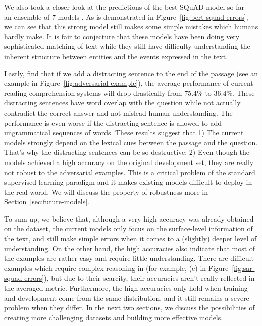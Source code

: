 We also took a closer look at the predictions of the best SQuAD model so far --- an ensemble of 7  models \cite{devlin2018bert}. As is demonstrated in Figure~\ref{fig:bert-squad-errors}, we can see that this strong model still makes some simple mistakes which humans hardly make. It is fair to conjecture that these models have been doing very sophisticated matching of text while they still have difficulty understanding the inherent structure between entities and the events expressed in the text.


Lastly,  find that if we add a distracting sentence to the end of the passage (see an example in Figure~\ref{fig:adversarial-example}), the average performance of current reading comprehension systems will drop drastically from 75.4\% to 36.4\%. These distracting sentences have word overlap with the question while not actually contradict the correct answer and not mislead human understanding. The performance is even worse if the distracting sentence is allowed to add ungrammatical sequences of words. These results suggest that 1) The current models strongly depend on the lexical cues between the passage and the question. That's why the distracting sentences can be so destructive; 2) Even though the models achieved a high accuracy on the original development set, they are really not robust to the adversarial examples. This is a critical problem of the standard supervised learning paradigm and it makes existing models difficult to deploy in the real world. We will discuss the property of robustness more in Section~\ref{sec:future-models}.

To sum up, we believe that, although a very high accuracy was already obtained on the  dataset, the current models only focus on the surface-level information of the text, and still make simple errors when it comes to a (slightly) deeper level of understanding. On the other hand, the high accuracies also indicate that most of the  examples are rather easy and require little understanding. There are difficult examples which require complex reasoning in  (for example, (c) in Figure~\ref{fig:sar-squad-errors}), but due to their scarcity, their accuracies aren't really reflected in the averaged metric. Furthermore, the high accuracies only hold when training and development come from the same distribution, and it still remains a severe problem when they differ. In the next two sections, we discuss the possibilities of creating more challenging datasets and building more effective models.
